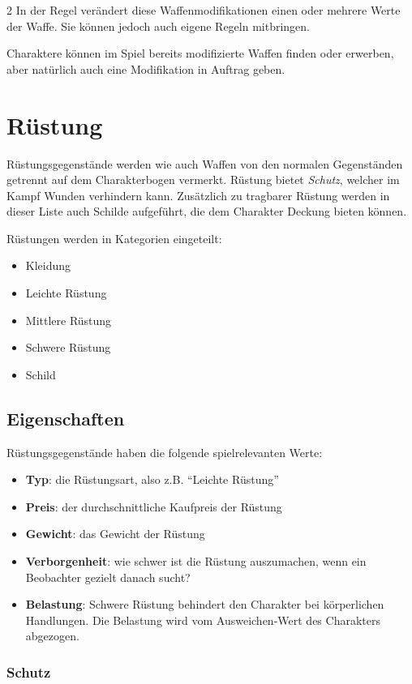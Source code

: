 \begin{multicols}{2}
In der Regel verändert diese Waffenmodifikationen einen oder mehrere Werte der Waffe. Sie können jedoch auch eigene Regeln mitbringen.

Charaktere können im Spiel bereits modifizierte Waffen finden oder erwerben, aber natürlich auch eine Modifikation in Auftrag geben.

\section{Rüstung}

Rüstungsgegenstände werden wie auch Waffen von den normalen Gegenständen getrennt auf dem Charakterbogen vermerkt. Rüstung bietet \textit{Schutz}, welcher im Kampf Wunden verhindern kann. Zusätzlich zu tragbarer Rüstung werden in dieser Liste auch Schilde aufgeführt, die dem Charakter Deckung bieten können.

Rüstungen werden in Kategorien eingeteilt:
\begin{itemize}
    \item Kleidung
    \item Leichte Rüstung
    \item Mittlere Rüstung
    \item Schwere Rüstung
    \item Schild
\end{itemize}

\subsection{Eigenschaften}

Rüstungsgegenstände haben die folgende spielrelevanten Werte:
\begin{itemize}
    \item \textbf{Typ}: die Rüstungsart, also z.B. ``Leichte Rüstung''
    \item \textbf{Preis}: der durchschnittliche Kaufpreis der Rüstung
    \item \textbf{Gewicht}: das Gewicht der Rüstung
    \item \textbf{Verborgenheit}: wie schwer ist die Rüstung auszumachen, wenn ein Beobachter gezielt danach sucht?
    \item \textbf{Belastung}: Schwere Rüstung behindert den Charakter bei körperlichen Handlungen. Die Belastung wird vom Ausweichen-Wert des Charakters abgezogen.
\end{itemize}

\subsubsection{Schutz}


\end{multicols}
